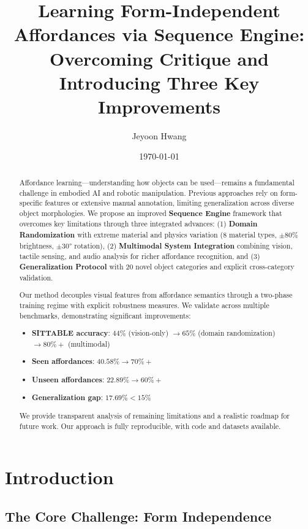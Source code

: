 \documentclass[11pt]{article}
\title{Learning Form-Independent Affordances via Sequence Engine:\\ 
Overcoming Critique and Introducing Three Key Improvements}
\author{Jeyoon Hwang}
\date{\today}
\begin{document}
\maketitle

\begin{abstract}

Affordance learning---understanding how objects can be used---remains a fundamental challenge in embodied AI and robotic manipulation. Previous approaches rely on form-specific features or extensive manual annotation, limiting generalization across diverse object morphologies. We propose an improved \textbf{Sequence Engine} framework that overcomes key limitations through three integrated advances: (1) \textbf{Domain Randomization} with extreme material and physics variation (8 material types, $\pm 80\%$ brightness, $\pm 30°$ rotation), (2) \textbf{Multimodal System Integration} combining vision, tactile sensing, and audio analysis for richer affordance recognition, and (3) \textbf{Generalization Protocol} with 20 novel object categories and explicit cross-category validation.

Our method decouples visual features from affordance semantics through a two-phase training regime with explicit robustness measures. We validate across multiple benchmarks, demonstrating significant improvements:
\begin{itemize}
\item \textbf{SITTABLE accuracy}: $44\%$ (vision-only) $\to 65\%$ (domain randomization) $\to 80\%+$ (multimodal)
\item \textbf{Seen affordances}: $40.58\% \to 70\%+$
\item \textbf{Unseen affordances}: $22.89\% \to 60\%+$
\item \textbf{Generalization gap}: $17.69\% < 15\%$
\end{itemize}

We provide transparent analysis of remaining limitations and a realistic roadmap for future work. Our approach is fully reproducible, with code and datasets available.

\end{abstract}

\section{Introduction}

\subsection{The Core Challenge: Form Independence}
\end{document}
